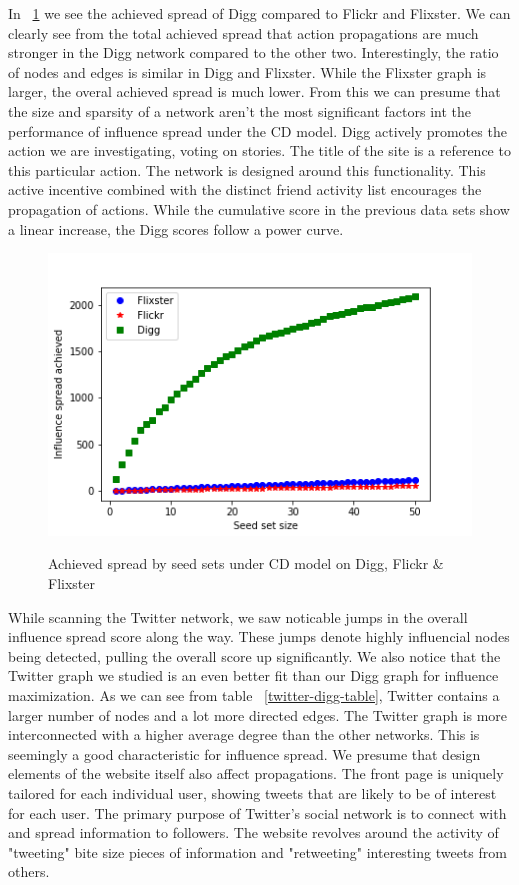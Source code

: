 \documentclass{acm_proc_article-sp}
\begin{document}
In ~\ref{spread3} we see the achieved spread of Digg compared to Flickr and Flixster. We can clearly see from the total achieved spread that action propagations are much stronger in the Digg network compared to the other two. Interestingly, the ratio of nodes and edges is similar in Digg and Flixster. While the Flixster graph is larger, the overal achieved spread is much lower. From this we can presume that the size and sparsity of a network aren't the most significant factors int the performance of influence spread under the CD model. Digg actively promotes the action we are investigating, voting on stories. The title of the site is a reference to this particular action. The network is designed around this functionality. This active incentive combined with the distinct friend activity list encourages the propagation of actions. While the cumulative score in the previous data sets show a linear increase, the Digg scores follow a power curve.

\begin{figure}[h]
	\includegraphics[width=\linewidth]{spread3.png}
	\centering
	\label{spread3}
    \caption{Achieved spread by seed sets under CD model on Digg, Flickr \& Flixster}
\end{figure}

While scanning the Twitter network, we saw noticable jumps in the overall influence spread score along the way. These jumps denote highly influencial nodes being detected, pulling the overall score up significantly. We also notice that the Twitter graph we studied is an even better fit than our Digg graph for influence maximization. As we can see from table ~\ref{twitter-digg-table}, Twitter contains a larger number of nodes and a lot more directed edges. The Twitter graph is more  interconnected with a higher average degree than the other networks. This is seemingly a good characteristic for influence spread. We presume that design elements of the website itself also affect propagations. The front page is uniquely tailored for each individual user, showing tweets that are likely to be of interest for each user. The primary purpose of Twitter's social network is to connect with and spread information to followers. The website revolves around the activity of "tweeting" bite size pieces of information and "retweeting" interesting tweets from others.
\end{document}
